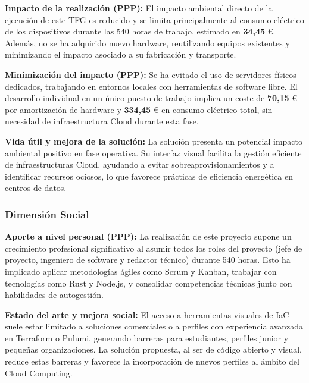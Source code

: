 \documentclass{article}
\begin{document}
    \justify
    \textbf{Impacto de la realización (PPP):} El impacto ambiental directo de la
    ejecución de este TFG es reducido y se limita principalmente al consumo
    eléctrico de los dispositivos durante las 540 horas de trabajo, estimado en
    \textbf{34,45} \euro{}. Además, no se ha adquirido nuevo hardware, reutilizando
    equipos existentes y minimizando el impacto asociado a su fabricación y
    transporte.

    \justify
    \textbf{Minimización del impacto (PPP):} Se ha evitado el uso de servidores
    físicos dedicados, trabajando en entornos locales con herramientas de software
    libre. El desarrollo individual en un único puesto de trabajo implica un coste
    de \textbf{70,15} \euro{} por amortización de hardware y
    \textbf{334,45} \euro{} en consumo eléctrico total, sin necesidad de
    infraestructura Cloud durante esta fase.

    \justify
    \textbf{Vida útil y mejora de la solución:} La solución presenta un potencial
    impacto ambiental positivo en fase operativa. Su interfaz visual facilita la
    gestión eficiente de infraestructuras Cloud, ayudando a evitar
    sobreaprovisionamientos y a identificar recursos ociosos, lo que favorece
    prácticas de eficiencia energética en centros de datos.
    
    
    \subsubsection{Dimensión Social}
    \normalsize
    \setlength{\parskip}{0.6em}
    \justify
    
    \textbf{Aporte a nivel personal (PPP):} La realización de este proyecto supone
    un crecimiento profesional significativo al asumir todos los roles del
    proyecto (jefe de proyecto, ingeniero de software y redactor técnico) durante
    540 horas. Esto ha implicado aplicar metodologías ágiles como Scrum y Kanban,
    trabajar con tecnologías como Rust y Node.js, y consolidar competencias
    técnicas junto con habilidades de autogestión.

    \justify
    \textbf{Estado del arte y mejora social:} El acceso a herramientas visuales de
    IaC suele estar limitado a soluciones comerciales o a perfiles con experiencia
    avanzada en Terraform o Pulumi, generando barreras para estudiantes, perfiles
    junior y pequeñas organizaciones. La solución propuesta, al ser de código
    abierto y visual, reduce estas barreras y favorece la incorporación de nuevos
    perfiles al ámbito del Cloud Computing.
\end{document}

